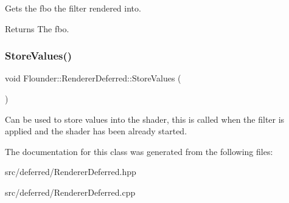 Gets the fbo the filter rendered into. 

\begin{DoxyReturn}{Returns}
The fbo. 
\end{DoxyReturn}
\mbox{\label{class_flounder_1_1_renderer_deferred_a617c5f432093bb0ea4c00fcee4146b37}} 
\subsubsection{\texorpdfstring{Store\+Values()}{StoreValues()}}
{\footnotesize\ttfamily void Flounder\+::\+Renderer\+Deferred\+::\+Store\+Values (\begin{DoxyParamCaption}{ }\end{DoxyParamCaption})\hspace{0.3cm}{\ttfamily [private]}}



Can be used to store values into the shader, this is called when the filter is applied and the shader has been already started. 



The documentation for this class was generated from the following files\+:\begin{DoxyCompactItemize}
\item 
src/deferred/Renderer\+Deferred.\+hpp\item 
src/deferred/Renderer\+Deferred.\+cpp\end{DoxyCompactItemize}
